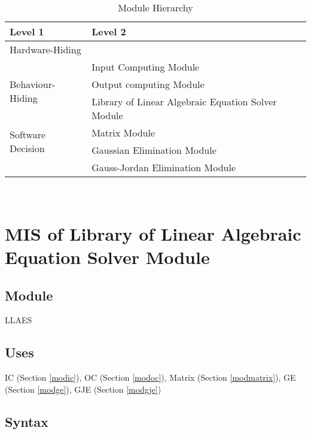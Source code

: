 \documentclass[12pt, titlepage]{article}
\begin{document}
\begin{table}[h!]
\centering
\begin{tabular}{p{} p{}}
\toprule
\textbf{Level 1} & \textbf{Level 2}\\
\midrule

{Hardware-Hiding} & ~ \\
\midrule

\multirow{3}{0.3\textwidth}{Behaviour-Hiding} 
& Input Computing Module\\
& Output computing Module\\
& Library of Linear Algebraic Equation Solver Module\\


\midrule

\multirow{2}{0.3\textwidth}{Software Decision}  
& Matrix Module\\

& Gaussian Elimination Module\\

& Gauss-Jordan Elimination Module\\


\bottomrule

\end{tabular}
\caption{Module Hierarchy}
\label{TblMH}
\end{table}

\newpage
~\newpage

\section{MIS of {Library of Linear Algebraic Equation Solver Module}} \label{modllaes} %

\subsection{Module}

LLAES


\subsection{Uses}
IC (Section \ref{modic}), OC (Section \ref{modoc}), Matrix (Section \ref{modmatrix}), GE (Section \ref{modge}), GJE (Section \ref{modgje})


\subsection{Syntax}
\end{document}
